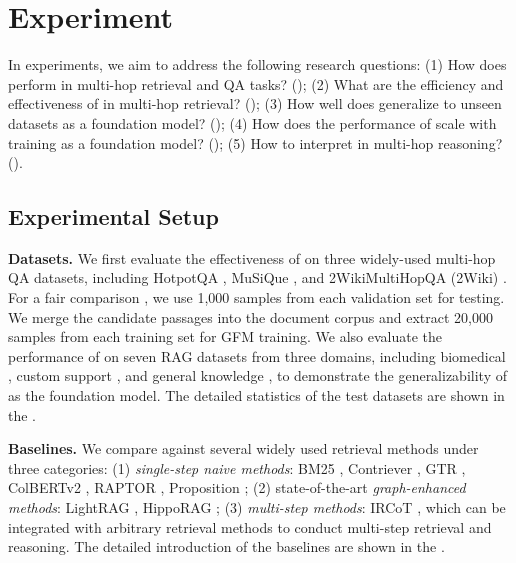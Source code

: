 \vspace{-0.8cm}
\section{Experiment}\label{sec:experiment}
In experiments, we aim to address the following research questions: (1) How does \ourmethod perform in multi-hop retrieval and QA tasks? (); (2) What are the efficiency and effectiveness of \ourmethod in multi-hop retrieval? (); (3) How well does \ourmethod generalize to unseen datasets as a foundation model? (); (4) How does the performance of \ourmethod scale with training as a foundation model? (); (5) How to interpret \ourmethod in multi-hop reasoning? ().

\subsection{Experimental Setup}\label{sec:setup}
\noindent\textbf{Datasets.} We first evaluate the effectiveness of \ourmethod on three widely-used multi-hop QA datasets, including HotpotQA \cite{yang2018hotpotqa}, MuSiQue \cite{trivedi2022musique}, and 2WikiMultiHopQA (2Wiki) \cite{ho2020constructing}. For a fair comparison \cite{trivedi2023interleaving,gutiérrez2024hipporag}, we use 1,000 samples from each validation set for testing. We merge the candidate passages into the document corpus and extract 20,000 samples from each training set for GFM training. We also evaluate the performance of \ourmethod on seven RAG datasets from three domains, including biomedical \cite{jin-etal-2019-pubmedqa}, custom support \cite{sadat-etal-2023-delucionqa,nandy-etal-2021-question-answering,malaviya2023expertqa,castelli-etal-2020-techqa}, and general knowledge \cite{nguyen2016ms,kamalloo2023hagrid}, to demonstrate the generalizability of \ourmethod as the foundation model. The detailed statistics of the test datasets are shown in the .

\noindent\textbf{Baselines.} We compare against several widely used retrieval methods under three categories: (1) \emph{single-step naive methods}: BM25 \cite{robertson1994some}, Contriever \cite{izacardunsupervised}, GTR \cite{ni2022large}, ColBERTv2 \cite{santhanam2022colbertv2}, RAPTOR \cite{sarthiraptor}, Proposition \cite{chen-etal-2024-dense}; (2) state-of-the-art \emph{graph-enhanced methods}: LightRAG \cite{guo2024lightrag}, HippoRAG \cite{gutiérrez2024hipporag}; (3) \emph{multi-step methods}: IRCoT \cite{trivedi2023interleaving}, which can be integrated with arbitrary retrieval methods to conduct multi-step retrieval and reasoning. The detailed introduction of the baselines are shown in the .

